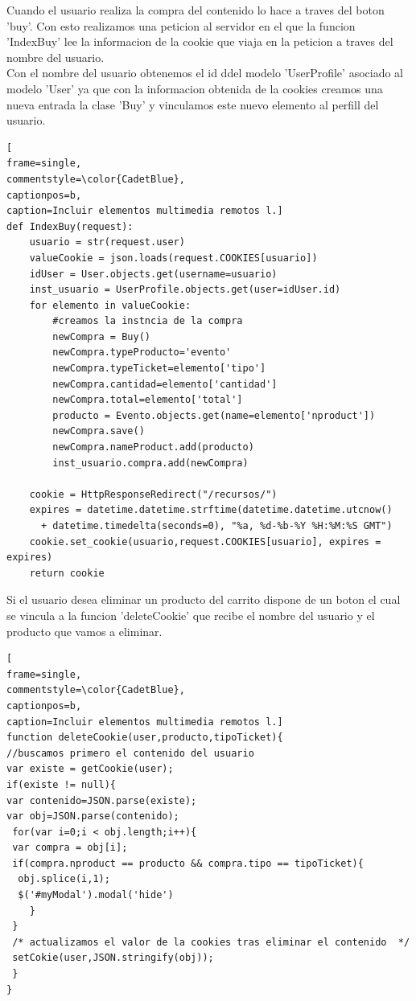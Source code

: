 Cuando el usuario realiza la compra del contenido lo hace a traves del boton 'buy'. Con esto realizamos una peticion al servidor en el que la funcion 'IndexBuy' lee la informacion de la cookie que viaja en la peticion a traves del nombre del usuario.
\\Con el nombre del usuario obtenemos el id ddel modelo 'UserProfile' asociado al modelo 'User' ya que con la informacion obtenida de la cookies creamos una nueva entrada la clase 'Buy' y vinculamos este nuevo elemento al perfill del usuario.
\begin{lstlisting}[
frame=single,
commentstyle=\color{CadetBlue},
captionpos=b,
caption=Incluir elementos multimedia remotos l.]
def IndexBuy(request):
	usuario = str(request.user)
	valueCookie = json.loads(request.COOKIES[usuario])
	idUser = User.objects.get(username=usuario)
	inst_usuario = UserProfile.objects.get(user=idUser.id)
	for elemento in valueCookie:
		#creamos la instncia de la compra
		newCompra = Buy()
		newCompra.typeProducto='evento'
		newCompra.typeTicket=elemento['tipo']
		newCompra.cantidad=elemento['cantidad']
		newCompra.total=elemento['total']
		producto = Evento.objects.get(name=elemento['nproduct'])
		newCompra.save()
		newCompra.nameProduct.add(producto)
		inst_usuario.compra.add(newCompra)
        
	cookie = HttpResponseRedirect("/recursos/")
	expires = datetime.datetime.strftime(datetime.datetime.utcnow()
      + datetime.timedelta(seconds=0), "%a, %d-%b-%Y %H:%M:%S GMT")
	cookie.set_cookie(usuario,request.COOKIES[usuario], expires = expires)
	return cookie
\end{lstlisting}  
Si el usuario desea eliminar un  producto del carrito dispone de un boton el cual se vincula a la funcion 'deleteCookie' que recibe el nombre del usuario y el producto que vamos a eliminar.
\lstset{language=, breaklines=true, basicstyle=\footnotesize}
\begin{lstlisting}[
frame=single,
commentstyle=\color{CadetBlue},
captionpos=b,
caption=Incluir elementos multimedia remotos l.]
function deleteCookie(user,producto,tipoTicket){
//buscamos primero el contenido del usuario
var existe = getCookie(user);
if(existe != null){
var contenido=JSON.parse(existe);
var obj=JSON.parse(contenido);
 for(var i=0;i < obj.length;i++){
 var compra = obj[i];
 if(compra.nproduct == producto && compra.tipo == tipoTicket){
  obj.splice(i,1);
  $('#myModal').modal('hide')
	}	
 }
 /* actualizamos el valor de la cookies tras eliminar el contenido  */	
 setCokie(user,JSON.stringify(obj));
 }
}
\end{lstlisting} 
